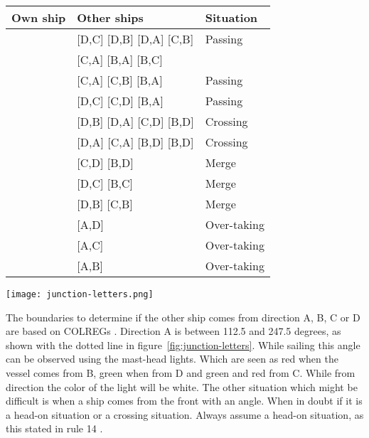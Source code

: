 \begin{minipage}{\textwidth}
	\begin{minipage}[b]{0.69\textwidth}
		\centering
		\begin{tabular}{l|l|l}
			Own ship & Other ships & Situation\\
			\hline
			\big[A,D\big] & [D,C] [D,B] [D,A] [C,B] & Passing \\
						  & [C,A] [B,A] [B,C] & \\
			\big[A,C\big] & [C,A] [C,B] [B,A] & Passing \\
			\big[A,B\big] & [D,C] [C,D] [B,A] & Passing \\
			\big[A,C\big] & [D,B] [D,A] [C,D] [B,D] & Crossing \\
			\big[A,B\big] & [D,A] [C,A] [B,D] [B,D] & Crossing \\
			\big[A,D\big] & [C,D] [B,D] & Merge \\
			\big[A,C\big] & [D,C] [B,C] & Merge \\
			\big[A,B\big] & [D,B] [C,B] & Merge \\
			\big[A,D\big] & [A,D] & Over-taking \\
			\big[A,C\big] & [A,C] & Over-taking \\
			\big[A,B\big] & [A,B] & Over-taking \\
		\end{tabular}
		\label{tab:scenarios-standard}
	\end{minipage}
	\hfill
	\begin{minipage}[b]{0.3\textwidth}
		\centering
		\texttt{[image: junction-letters.png]}
		\label{fig:junction-letters}
	\end{minipage}
\end{minipage}

The boundaries to determine if the other ship comes from direction A, B, C or D are based on \ac{COLREGs} \cite{IMO1972}. Direction A is between 112.5 and 247.5 degrees, as shown with the dotted line in figure~\ref{fig:junction-letters}. While sailing this angle can be observed using the mast-head lights. Which are seen as red when the vessel comes from B, green when from D and green and red from C. While from direction the color of the light will be white. The other situation which might be difficult is when a ship comes from the front with an angle. When in doubt if it is a head-on situation or a crossing situation. Always assume a head-on situation, as this stated in rule 14 \cite{IMO1972}.

